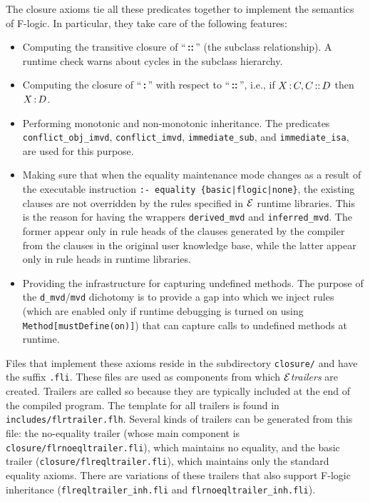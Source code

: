 \documentclass[11pt]{article}
\newcommand{\ERGO}{\mbox{\ensuremath{\cal{E}}\smaller{{\sc{RGO}}}}\xspace}
\newcommand{\FLSYSTEM}{\ERGO}
\newcommand{\isa}{\,{\bf{:}}\,}
\newcommand{\subcl}{\,{\bf{::}}\,}
\newcommand{\fl}{\mbox{F-logic}\xspace}
\begin{document}
The closure axioms tie all these predicates together to implement the
semantics of \fl. In particular, they take care of the following features:
\begin{itemize}
\item Computing the transitive closure of ``\subcl'' (the subclass
  relationship).  A runtime check warns about cycles in the subclass
  hierarchy.
\item Computing the closure of ``\isa'' with respect to ``\subcl'', i.e.,
  if $X\isa C, C\subcl D$ then $X\isa D$.
\item Performing monotonic and non-monotonic inheritance. The predicates
  {\tt conflict\_obj\_imvd}, {\tt conflict\_imvd}, {\tt immediate\_sub},
  and {\tt immediate\_isa}, are used for this purpose.
\item Making sure that when the equality maintenance mode changes as a
  result of the executable instruction {\tt :- equality
  \{basic|flogic|none\}}, the existing clauses are not overridden by the
  rules specified in \FLSYSTEM runtime libraries. This is the reason for
  having the wrappers {\tt derived\_mvd} and {\tt inferred\_mvd}. The former
  appear only in rule heads of the clauses generated by the compiler
  from the clauses in the original user knowledge base, while the latter appear only in
  rule heads in runtime libraries.
\item Providing the infrastructure for capturing undefined methods.
  The purpose of the {\tt d\_mvd}/{\tt mvd} dichotomy is to provide a gap
  into which we inject rules
  (which are enabled only if runtime debugging is turned on using
  {\tt Method[mustDefine(on)]}) that can capture calls to undefined
  methods at runtime.
\end{itemize}
Files that implement these axioms reside in the subdirectory
\texttt{closure/} and have the suffix {\tt .fli}.  These files are used as
components from which \FLSYSTEM \emph{trailers} are created.  Trailers are
called so because they are typically included at the end of the compiled
program. The template for all trailers is found in
{\tt includes/flrtrailer.flh}.  Several kinds of trailers can be generated from
this file: the no-equality trailer (whose main component is {\tt
  closure/flrnoeqltrailer.fli}), which maintains no equality, and the basic
trailer ({\tt closure/flreqltrailer.fli}), which maintains only the
standard equality axioms.
There are variations of these trailers that also support \fl inheritance
({\tt flreqltrailer\_inh.fli}  and {\tt flrnoeqltrailer\_inh.fli}).
\end{document}
